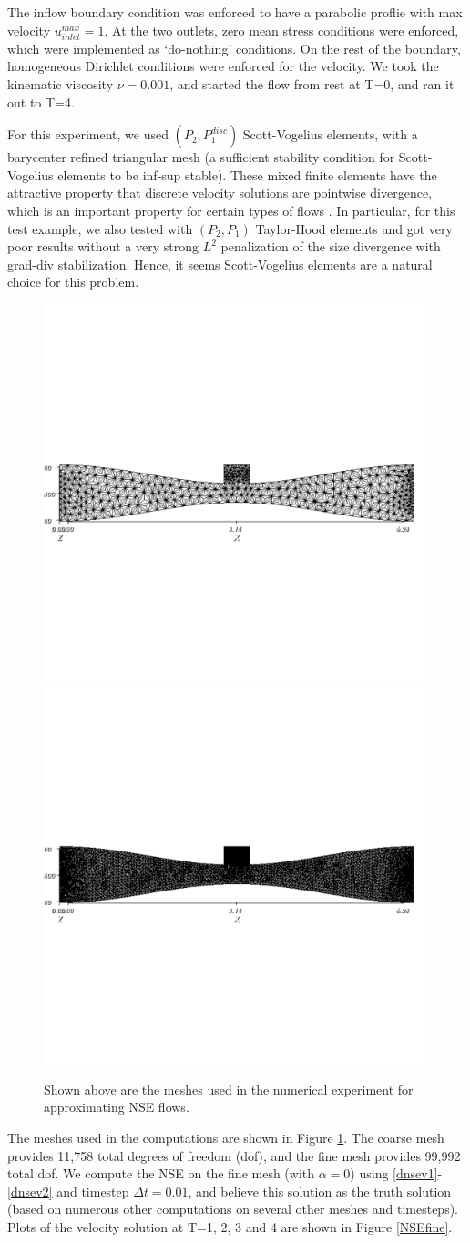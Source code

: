 \documentclass[11pt]{article}%
\numberwithin{equation}{section}
\begin{document}
The inflow boundary condition was enforced to have a parabolic proflie with max velocity $u_{inlet}^{max}=1$.  At the two outlets, zero mean stress conditions were enforced, which were implemented as `do-nothing' conditions.  On the rest of the boundary, homogeneous Dirichlet conditions were enforced for the velocity.  We took the kinematic viscosity $\nu=0.001$, and started the flow from rest at T=0, and ran it out to T=4.

For this experiment, we used $(P_2,P_1^{disc})$ Scott-Vogelius elements, with a barycenter refined triangular mesh (a sufficient stability condition for Scott-Vogelius elements to be inf-sup stable).  These mixed finite elements have the attractive property that discrete velocity solutions are pointwise divergence, which is an important property for certain types of flows \cite{CELR10,linke09}.  In particular, for this test example, we also tested with $(P_2,P_1)$ Taylor-Hood elements and got very poor results without a very strong $L^2$ penalization of the size divergence with grad-div stabilization.  Hence, it seems Scott-Vogelius elements are a natural choice for this problem.

\begin{figure}[h!]
\begin{center}
\includegraphics[width=.8\textwidth,height=0.16\textwidth, viewport=23 243 570 350, clip]{stackmeshbary.pdf} \\
\includegraphics[width=.8\textwidth,height=0.16\textwidth, viewport=23 243 570 350, clip]{stackmeshbaryfine.pdf} 
\end{center}
\caption{\label{NSEmeshes}
Shown above are the meshes used in the numerical experiment for approximating NSE flows.}
\end{figure}

The meshes used in the computations are shown in Figure \ref{NSEmeshes}.  The coarse mesh provides 11,758 total degrees of freedom (dof), and the fine mesh provides 99,992 total dof.  We compute the NSE on the fine mesh (with $\alpha=0$) using \eqref{dnsev1}-\eqref{dnsev2} and timestep $\Delta t=0.01$, and believe this solution as the truth solution (based on numerous other computations on several other meshes and timesteps).  Plots of the velocity solution at T=1, 2, 3 and 4 are shown in Figure \ref{NSEfine}.  
\end{document}
